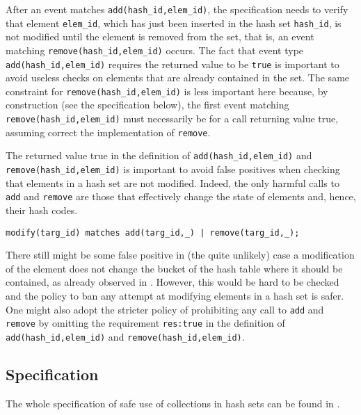 After an event matches \lstinline{add(hash_id,elem_id)}, the specification needs to verify that 
element \lstinline{elem_id}, which has just been inserted in the hash set \lstinline{hash_id}, is not modified 
until the element is removed from the set, that is, an event matching \lstinline{remove(hash_id,elem_id)} occurs.
The fact that event type \lstinline{add(hash_id,elem_id)} requires the returned value to be \lstinline{true} is important to avoid
useless checks on elements that are already contained in the set. The same constraint for \lstinline{remove(hash_id,elem_id)} is less important here
because, by construction (see the specification below), the first event matching \lstinline{remove(hash_id,elem_id)} must necessarily be for a call returning value true, assuming correct the implementation of \lstinline{remove}.

The returned value true in the definition of  \lstinline{add(hash_id,elem_id)} and \lstinline{remove(hash_id,elem_id)} is important to avoid false positives when checking that elements in a hash set are not modified. Indeed, the only harmful calls to \lstinline{add} and
\lstinline{remove} are those that effectively change the state of elements and, hence, their hash codes.
\begin{lstlisting}[basicstyle=\ttfamily\scriptsize]
modify(targ_id) matches add(targ_id,_) | remove(targ_id,_);
\end{lstlisting}
There still might be some false positive in (the quite unlikely) case a modification of the element does not change the bucket of the hash table
where it should be contained, as already observed in . However, this would be hard to be checked and the policy to ban any attempt at modifying elements in a hash set is safer. One might also adopt the stricter policy of prohibiting any call to \lstinline{add} and \lstinline{remove} by omitting the requirement \lstinline{res:true} in the definition of \lstinline{add(hash_id,elem_id)} and \lstinline{remove(hash_id,elem_id)}.

\subsection*{Specification}
The whole specification of safe use of collections in hash sets can be found in .

